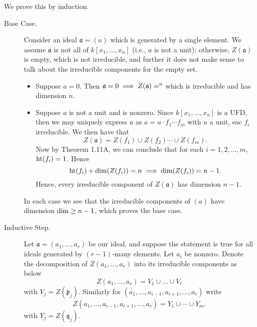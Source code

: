 \documentclass{hw_pset} %
\DeclareMathOperator{\Ht}{\rm{ht}}    %
\DeclareMathOperator{\Dim}{\rm{dim}}  %
\let\aa\relax
\DeclareMathOperator{\aa}{\mathbf{A}} %
\newcommand{\x}{x_1, \dots, x_n}    %
\newcommand{\idl}[1]{\mathfrak{#1}} %
\begin{document}
\begin{solution}
    We prove this by induction. 
    \begin{description}
        \item[Base Case.] Consider an ideal $\idl{a} = (a)$ which 
        is generated by a single element. We assume $\idl{a}$ is not all of $k[\x]$ (i.e., $a$ is not a unit);
        otherwise, $Z(\idl{a})$ is empty, which is not irreducible, and further 
        it does not make sense to talk about the irreducible components for the empty set. 
        \begin{itemize}
            \item Suppose $a = 0$. Then $\idl{a} = 0 \implies Z(\idl{a}) = \aa^n$ which is irreducible 
            and has dimension $n$.

            \item Suppose $a$ is not a unit and is nonzero. Since $k[\x]$ is a UFD, then 
            we may uniquely express $a$ as $a = u\cdot f_1 \cdots f_m$ with $u$ a unit, eac 
            $f_i$ irreducible. We then have that 
            \[
                Z(\idl{a}) = Z(f_1) \cup Z(f_2) \cdots \cup Z(f_m).
            \]
            Now by Theorem 1.11A, we can conclude that for each $i= 1, 2, \dots, m$, 
            $\Ht(f_i) = 1$. Hence 
            \[
                \Ht(f_i) + \Dim(Z(f_i)) = n \implies \Dim(Z(f_i)) = n - 1.
            \]
            Hence, every irreducible component of $Z(\idl{a})$ has dimension $n - 1$.
        \end{itemize}
        In each case we see that the irreducible components of $(a)$ have dimension 
        $\Dim \ge n - 1$, which proves the base case. 

        \item[Inductive Step.]
        Let $\idl{a} = (a_1, \dots, a_r)$ be our ideal, and suppose the statement 
        is true for all ideals generated by $(r-1)$-many elements. Let $a_i$ be nonzero.
        Denote the decomposition of $Z(a_1, \dots, a_r)$ into its irreducible components as below 
        \[
            Z(a_1, \dots, a_r) = V_1 \cup \dots \cup V_{\ell}
        \]
        with $V_j = Z(\idl{p}_j)$.
        Similarly for $(a_1, \dots, a_{i-1}, a_{i+1}, \dots, a_r)$ write
        \[
            Z(a_1, \dots, a_{i-1}, a_{i+1}, \dots, a_r) = Y_1 \cup \cdots \cup Y_m.
        \]
        with $Y_j = Z(\idl{q}_j)$. 


\end{description}
\end{solution}
\end{document}
